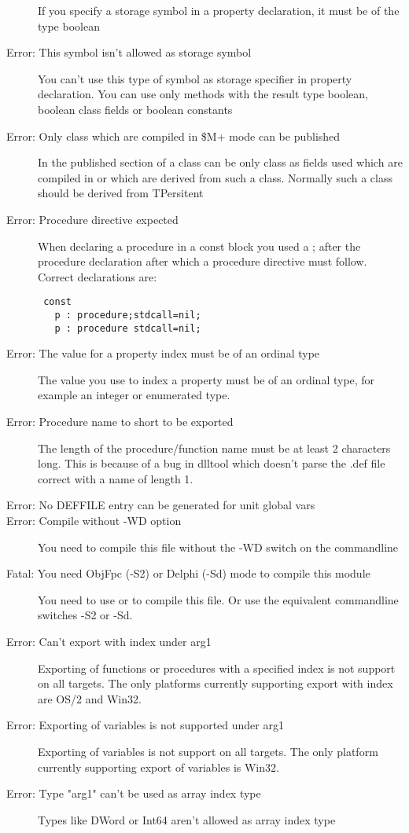 \begin{description}
 If you specify a storage symbol in a property declaration, it must be of
 the type boolean
\item [Error: This symbol isn't allowed as storage symbol]
 You can't use this type of symbol as storage specifier in property
 declaration. You can use only methods with the result type boolean,
 boolean class fields or boolean constants
\item [Error: Only class which are compiled in \$M+ mode can be published]
 In the published section of a class can be only class as fields used which
 are compiled in  or which are derived from such a class. Normally
 such a class should be derived from TPersitent
\item [Error: Procedure directive expected]
 When declaring a procedure in a const block you used a ; after the
 procedure declaration after which a procedure directive must follow.
 Correct declarations are:
 \begin{verbatim}
 const
   p : procedure;stdcall=nil;
   p : procedure stdcall=nil;
 \end{verbatim}
\item [Error: The value for a property index must be of an ordinal type]
 The value you use to index a property must be of an ordinal type, for
 example an integer or enumerated type.
\item [Error: Procedure name to short to be exported]
 The length of the procedure/function name must be at least 2 characters
 long. This is because of a bug in dlltool which doesn't parse the .def
 file correct with a name of length 1.
\item [Error: No DEFFILE entry can be generated for unit global vars]
\item [Error: Compile without -WD option]
 You need to compile this file without the -WD switch on the
 commandline
\item [Fatal: You need ObjFpc (-S2) or Delphi (-Sd) mode to compile this module]
 You need to use  or  to compile this file.
 Or use the equivalent commandline switches -S2 or -Sd.
\item [Error: Can't export with index under arg1]
 Exporting of functions or procedures with a specified index is not
 support on all targets. The only platforms currently supporting
 export with index are OS/2 and Win32.
\item [Error: Exporting of variables is not supported under arg1]
 Exporting of variables is not support on all targets. The only platform
 currently supporting export of variables is Win32.
\item [Error: Type "arg1" can't be used as array index type]
 Types like DWord or Int64 aren't allowed as array index type
 \end{description}
